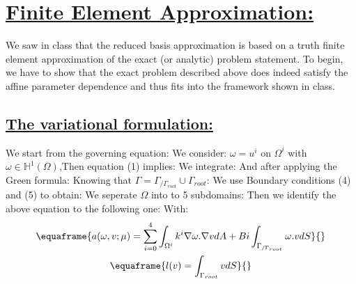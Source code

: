 \chapter[Finite Element Approximation]{\uline{Finite Element Approximation:}}
We saw in class that the reduced basis approximation is based on a truth finite element approximation of the exact (or analytic) problem statement. To begin, we have to show that the exact problem described above does indeed satisfy the affine parameter dependence and thus fits into the framework shown in class.

\section[Question a: The variational formulation]{\uline{The variational formulation:}}
We start from the governing equation:
We consider: $\omega=u^i$ on $\Omega^i$ with $\omega \in \mathbb{H}^1(\Omega)$,Then equation (1) implies:
We integrate:
And after applying the Green formula:
Knowing that $\Gamma = \Gamma_{ / \Gamma_{root}} \cup \Gamma_{root}$:
We use Boundary conditions (4) and (5) to obtain:
We seperate $\Omega$ into to 5 subdomains:
Then we identify the above equation to the following one:
With:
\begin{gather*}
   \equaframe{ a(\omega, v; \mu) = \sum_{i=0}^4 \int_{\Omega^i} k^i \nabla \omega . \nabla v dA 
 + Bi\int_{\Gamma_{/\Gamma_{root}}} \omega . v dS
  }{}
\\ 
   \equaframe{  l(v) = \int_{\Gamma_{root}} v dS 
  }{}
\end{gather*}

